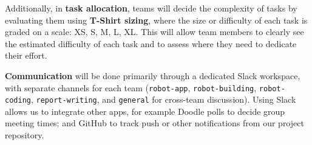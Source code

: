 \documentclass{article}
\begin{document}
Additionally, in {\bf task allocation}, teams will decide the complexity of tasks by evaluating them using {\bf T-Shirt sizing}, where the size or difficulty of each task is graded on a scale: XS, S, M, L, XL. This will allow team members to clearly see the estimated difficulty of each task and to assess where they need to dedicate their effort. 

{\bf Communication} will be done primarily through a dedicated Slack workspace, with separate channels for each team ({\tt robot-app}, {\tt robot-building}, {\tt robot-coding}, {\tt report-writing}, and {\tt general} for cross-team discussion). Using Slack allows us to integrate other apps, for example Doodle polls to decide group meeting times; and GitHub to track push or other notifications from our project repository. 




\end{document}
